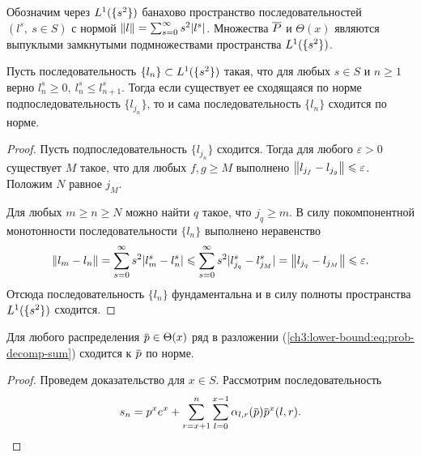 {Обозначим через $L^1(\{s^2\})$ банахово пространство последовательностей $(l^s,\ s \in S)$ с нормой $\left\lVert l\right\rVert = \sum_{s = 0}^\infty s^2 |l^s|$.
Множества $\overline{P}$ и $\Theta(x)$ являются выпуклыми замкнутыми подмножествами пространства $L^1(\{s^2\})$.

\begin{lemma}
  \label{ch3:lower-bound:lemma:subseq-convergence}
  Пусть последовательность $\{l_n\} \subset L^1(\{s^2\})$ такая, что для любых $s \in S$ и $n \geqslant 1$ верно $l_n^s \geqslant 0,\ l_n^s \leqslant l_{n+1}^s$.
  Тогда если существует ее сходящаяся по норме подпоследовательность $\{l_{j_n}\}$, то и сама последовательность $\{l_n\}$ сходится по норме.
\end{lemma}
\begin{proof}
  Пусть подпоследовательность $\{l_{j_n}\}$ сходится.
  Тогда для любого $\varepsilon > 0$ существует $M$ такое, что для любых $f, g \geqslant M$ выполнено 
  $\left\lVert l_{j_f} - l_{j_g}\right\rVert \leqslant \varepsilon$.
  Положим $N$ равное $j_M$.
  
  Для любых $m \geqslant n \geqslant N$ можно найти $q$ такое, что $j_q \geqslant m$.
  В силу покомпонентной монотонности последовательности $\{l_n\}$ выполнено неравенство
  \begin{gather*}
    \left\lVert l_m - l_n\right\rVert =
    \sum_{s=0}^\infty s^2 |l_m^s - l_n^s| \leqslant
    \sum_{s=0}^\infty s^2 |l_{j_q}^s - l_{j_M}^s| =
    \left\lVert l_{j_q} - l_{j_M}\right\rVert \leqslant \varepsilon.
  \end{gather*}
  Отсюда последовательность $\{l_n\}$ фундаментальна и в силу полноты пространства $L^1(\{s^2\})$ сходится.
\end{proof}

\begin{lemma}
  \label{ch3:lower-bound:lemma:decomp-convergence}
  Для любого распределения $\p \in \Theta(x)$ ряд в разложении (\ref{ch3:lower-bound:eq:prob-decomp-sum}) сходится к $\p$ по норме.
\end{lemma}
\begin{proof}
  Проведем доказательство для $x \in S$.
  Рассмотрим последовательность
  \begin{equation*}
    s_n = p^x e^x + \sum_{r=x+1}^n \sum_{l=0}^{x-1} \alpha_{l,r}(\p) \p^x(l, r).
  \end{equation*}


\end{proof}}
